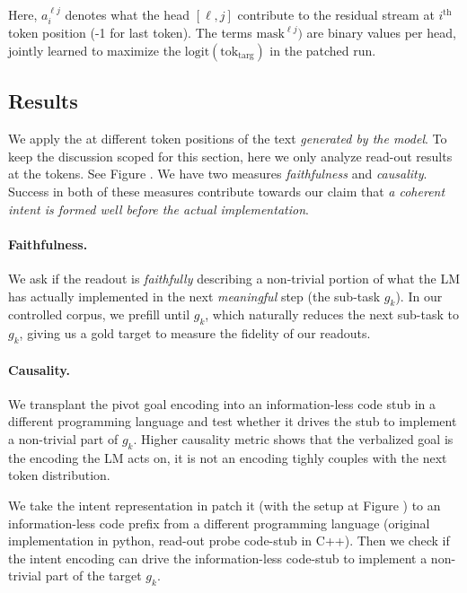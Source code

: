 Here, $a^{\ell j}_{i}$ denotes what the head $[\ell, j]$ contribute to the residual stream at $i^\text{th}$ token position (-1 for last token). The terms $\mathrm{mask}^{\ell j})$ are binary values per head, jointly learned to maximize the $\mathrm{logit}(\mathrm{tok}_\mathrm{targ})$ in the patched run.

\subsection{Results}
We apply the \goalscope at different token positions of the text \emph{generated by the model}. To keep the discussion scoped for this section, here we only analyze read-out results at the \pivot tokens. See {\color{red} Figure } . We have two measures \emph{faithfulness} and \emph{causality}. Success in both of these measures contribute towards our claim that \emph{a coherent intent is formed well before the actual implementation}.

\paragraph{Faithfulness.} We ask if the readout is \emph{faithfully} describing a non-trivial portion of what the LM has actually implemented in the next \emph{meaningful} step (the sub-task $g_k$). In our controlled corpus, we prefill until $g_k$, which naturally reduces the next sub-task to $g_k$, giving us a gold target to measure the fidelity of our readouts.

\paragraph{Causality.}  We transplant the pivot goal encoding into an information-less code stub in a different programming language and test whether it drives the stub to implement a non-trivial part of $g_k$. Higher causality metric shows that the verbalized goal is the encoding the LM acts on, it is not an encoding tighly couples with the next token distribution.

We take the intent representation in patch it (with the setup at {\color{red} Figure }) to an information-less code prefix from a different programming language (original implementation in python, read-out probe code-stub in C++). Then we check if the intent encoding can drive the information-less code-stub to implement a non-trivial part of the target $g_k$.

